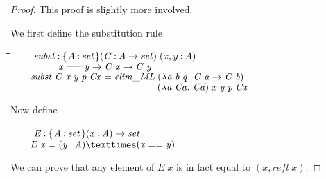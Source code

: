 \documentclass[11pt]{article}
\newlength{\lwidth}\setlength{\lwidth}{4.5cm}
\newlength{\cwidth}\setlength{\cwidth}{8mm} %
\newcommand{\Conid}[1]{\mathit{#1}}
\newcommand{\Varid}[1]{\mathit{#1}}
\begin{document}
\begin{proof}
    This proof is slightly more involved.

    We first define the substitution rule
\begin{tabbing}
\qquad\=\hspace{\lwidth}\=\hspace{\cwidth}\=\+\kill
${\hskip1.00em\relax\hskip1.00em\relax\Varid{subst}\mathbin{:}\{\mskip1.5mu \Conid{A}\mathbin{:}\Set\mskip1.5mu\}(\Conid{C}\mathbin{:}\Conid{A}\to \Set)\;(\Varid{x},\Varid{y}\mathbin{:}\Conid{A})}$\\
${\hskip1.00em\relax\hskip1.00em\relax\phantom{\Varid{subst}\mathbin{:}\mbox{}}\Varid{x}==\Varid{y}\to \Conid{C}\;\Varid{x}\to \Conid{C}\;\Varid{y}}$\\
${\hskip1.00em\relax\hskip1.00em\relax\Varid{subst}\;\Conid{C}\;\Varid{x}\;\Varid{y}\;\Varid{p}\;\Conid{Cx}\mathrel{=}\Varid{elim\char95 ML}\;(\lambda \Varid{a}\;\Varid{b}\;\Varid{q}.~\Conid{C}\;\Varid{a}\to \Conid{C}\;\Varid{b})\;}$\\
${\hskip1.00em\relax\hskip1.00em\relax\phantom{\Varid{subst}\;\Conid{C}\;\Varid{x}\;\Varid{y}\;\Varid{p}\;\Conid{Cx}\mathrel{=}\Varid{elim\char95 ML}\;\mbox{}}(\lambda \Varid{a}\;\Conid{Ca}.~\Conid{Ca})\;\Varid{x}\;\Varid{y}\;\Varid{p}\;\Conid{Cx}}$
\end{tabbing}
    Now define

\begin{tabbing}
\qquad\=\hspace{\lwidth}\=\hspace{\cwidth}\=\+\kill
${\hskip1.00em\relax\hskip1.00em\relax\Conid{E}\mathbin{:}\{\mskip1.5mu \Conid{A}\mathbin{:}\Set\mskip1.5mu\}(\Varid{x}\mathbin{:}\Conid{A})\to \Set}$\\
${\hskip1.00em\relax\hskip1.00em\relax\Conid{E}\;\Varid{x}\mathrel{=}(\Varid{y}\mathbin{:}\Conid{A})×(\Varid{x}==\Varid{y})}$
\end{tabbing}
    We can prove that any element of \ensuremath{\Conid{E}\;\Varid{x}} is in fact equal to \ensuremath{(\Varid{x},\Varid{refl}\;\Varid{x})}.


\end{proof}
\end{document}
